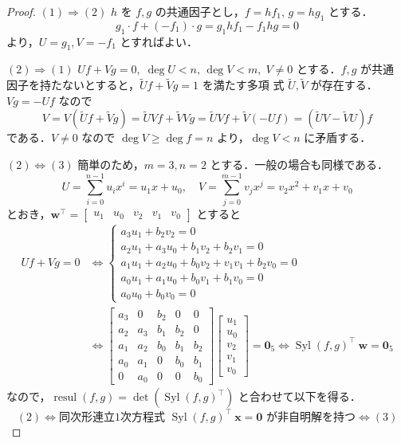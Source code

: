 \documentclass[12pt, uplatex, dvipdfmx]{jsarticle}
\theoremstyle{definition}
\DeclareMathOperator{\Syl}{Syl}
\DeclareMathOperator{\resul}{resul}
\begin{document}
\begin{proof}
  $(1) \Rightarrow (2)$ $h$ を $f,g$ の共通因子とし，$f=hf_1, \,
  g=hg_1$ とする．
  \[
    g_1 \cdot f + (-f_1) \cdot g = g_1  hf_1 - f_1 hg = 0
  \]
  より，$U=g_1, V=-f_1$ とすればよい．

  $(2) \Rightarrow (1)$
  $Uf+Vg=0, \; \deg U<n, \, \deg V<m, \; V \neq 0$ とする．$f,g$ が共通
  因子を持たないとすると，$\tilde{U}f+\tilde{V}g=1$ を満たす多項
  式 $\tilde{U}, \tilde{V}$ が存在する．$Vg = -Uf$ なので
  \[
    V = V(\tilde{U}f+\tilde{V}g) = \tilde{U}Vf + \tilde{V}Vg = \tilde{U}Vf + \tilde{V}(-Uf) = (\tilde{U}V - \tilde{V}U)f
  \]
  である．$V \neq 0$ なので $\deg V \geq \deg f = n$ より，$\deg V <n$ に矛盾する．

  $(2) \Leftrightarrow (3)$ 簡単のため，$m=3, n=2$
  とする．一般の場合も同様である．
  \[
    U= \sum_{i=0}^{n-1} u_i x^i=u_1 x + u_0, \quad V= \sum_{j=0}^{m-1} v_j x^j=v_2 x^2+v_1 x + v_0
  \]
  とおき，$\bm{w}^{\top} = \left[
    \begin{array}{ccccc}
      u_1 & u_0 & v_2 & v_1 & v_0
    \end{array}
    \right]$ とすると
  \[
    \begin{aligned}
      Uf+Vg=0 &\Leftrightarrow
      \begin{cases}
        a_3u_1 + b_2v_2=0\\
        a_2u_1+a_3u_0+b_1v_2+b_2v_1=0\\
        a_1u_1+a_2u_0+b_0v_2+v_1v_1+b_2v_0=0\\
        a_0u_1+a_1u_0+b_0v_1+b_1v_0=0\\
        a_0u_0+b_0v_0=0
      \end{cases}\\
      & \Leftrightarrow \left[
        \begin{array}{ccccc}
          a_3 & 0 & b_2 & 0 & 0\\
          a_2 & a_3 & b_1 & b_2 & 0\\
          a_1 & a_2 & b_0 & b_1 & b_2\\
          a_0 & a_1 & 0 & b_0 & b_1\\
          0 & a_0 & 0 & 0 & b_0
        \end{array}
      \right] \left[
        \begin{array}{c}
          u_1\\
          u_0\\
          v_2\\
          v_1\\
          v_0
        \end{array}
      \right] = \bm{0}_5
      \Leftrightarrow \Syl(f,g)^{\top} ~\bm{w}= \bm{0}_5
    \end{aligned}
  \]
  なので，$\resul(f,g) = \det\left(\Syl(f,g)^{\top}\right)$ と合わせて以下を得る．
  \[
    (2) \Leftrightarrow \text{同次形連立1次方程式 } \Syl(f,g)^{\top}~\bm{x}=\bm{0} \text{ が非自明解を持つ}
    \Leftrightarrow (3)
  \]
\end{proof}
\end{document}
